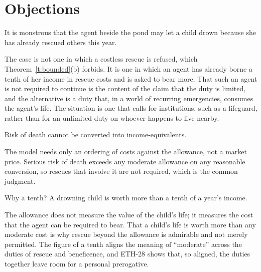 \documentclass{situationist-preprint}
\begin{document}
\section{Objections}

\begin{objection}
It is monstrous that the agent beside the pond may let a child drown because she has already rescued others this year.
\end{objection}

\begin{reply}
The case is not one in which a costless rescue is refused, which Theorem~\ref{t:bounded}(b) forbids. It is one in which an agent has already borne a tenth of her income in rescue costs and is asked to bear more. That such an agent is not required to continue is the content of the claim that the duty is limited, and the alternative is a duty that, in a world of recurring emergencies, consumes the agent's life. The situation is one that calls for institutions, such as a lifeguard, rather than for an unlimited duty on whoever happens to live nearby.
\end{reply}

\begin{objection}
Risk of death cannot be converted into income-equivalents.
\end{objection}

\begin{reply}
The model needs only an ordering of costs against the allowance, not a market price. Serious risk of death exceeds any moderate allowance on any reasonable conversion, so rescues that involve it are not required, which is the common judgment.
\end{reply}

\begin{objection}
Why a tenth? A drowning child is worth more than a tenth of a year's income.
\end{objection}

\begin{reply}
The allowance does not measure the value of the child's life; it measures the cost that the agent can be required to bear. That a child's life is worth more than any moderate cost is why rescue beyond the allowance is admirable and not merely permitted. The figure of a tenth aligns the meaning of ``moderate'' across the duties of rescue and beneficence, and ETH-28 shows that, so aligned, the duties together leave room for a personal prerogative.
\end{reply}
\end{document}
